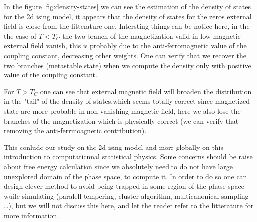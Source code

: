 \documentclass[ansiapaper]{report}
\begin{document}
\begin{multicols}{3}
In the figure \ref{fig:density-states} we can see the estimation of the density of states for the 2d ising model, it appears that the density of states for the zeros external field is close from the litterature one. Intersting things can be notice here, in the the case of $T<T_C$ the two branch of the magnetization valid in low magnetic external field vanish, this is probably due to the anti-ferromagnetic value of the coupling constant, decreasing other weights. One can verify that we recover the two branches (metastable state) when we compute the density only with positive value of the coupling constant. 

For $T>T_C$ one can see that external magnetic field will broaden the distribution in the "tail" of the density of states,which seems totally correct since magnetized state are more probable in non vanishing magnetic field, here we also lose the branches of the magnetization which is physically correct (we can verify that removing the anti-ferrmoagnetic contribution). 

This conlude our study on the 2d ising model and more globally on this introduction to computationnal statistical physics. Some concerns should be raise about free energy calculation since we absolutely need to do not have large unexplored domain of the phase space, to compute it. In order to do so one can design clever method to avoid being trapped in some region of the phase space wuile simulating (paralell tempering, cluster algorithm, multicanonical sampling \dots), but we will not discuss this here, and let the reader refer to the litterature for more information.


    \nocite{*}
    \printbibliography

\end{multicols}
\end{document}
